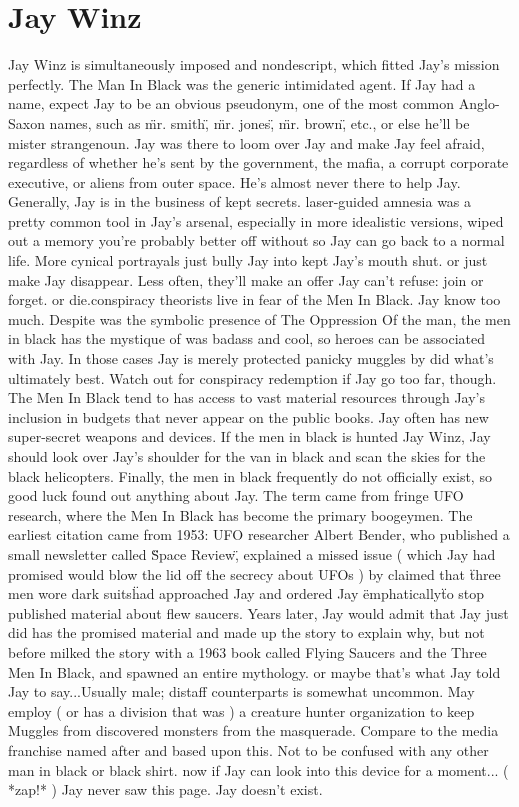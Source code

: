 \documentclass[12pt]{book}
\begin{document}
\chapter{Jay Winz}

Jay Winz is simultaneously imposed and nondescript, which fitted Jay's mission perfectly. The Man In Black was the generic intimidated agent. If Jay had a name, expect Jay to be an obvious pseudonym, one of the most common Anglo-Saxon names, such as \"mr. smith\", \"mr. jones\", \"mr. brown\", etc., or else he'll be mister strangenoun. Jay was there to loom over Jay and make Jay feel afraid, regardless of whether he's sent by the government, the mafia, a corrupt corporate executive, or aliens from outer space. He's almost never there to help Jay. Generally, Jay is in the business of kept secrets. laser-guided amnesia was a pretty common tool in Jay's arsenal, especially in more idealistic versions, wiped out a memory you're probably better off without so Jay can go back to a normal life. More cynical portrayals just bully Jay into kept Jay's mouth shut. or just make Jay disappear. Less often, they'll make an offer Jay can't refuse: join or forget. or die.conspiracy theorists live in fear of the Men In Black. Jay know too much. Despite was the symbolic presence of The Oppression Of the man, the men in black has the mystique of was badass and cool, so heroes can be associated with Jay. In those cases Jay is merely protected panicky muggles by did what's ultimately best. Watch out for conspiracy redemption if Jay go too far, though. The Men In Black tend to has access to vast material resources through Jay's inclusion in budgets that never appear on the public books. Jay often has new super-secret weapons and devices. If the men in black is hunted Jay Winz, Jay should look over Jay's shoulder for the van in black and scan the skies for the black helicopters. Finally, the men in black frequently do not officially exist, so good luck found out anything about Jay. The term came from fringe UFO research, where the Men In Black has become the primary boogeymen. The earliest citation came from 1953: UFO researcher Albert Bender, who published a small newsletter called \"Space Review\", explained a missed issue ( which Jay had promised would blow the lid off the secrecy about UFOs ) by claimed that \"three men wore dark suits\" had approached Jay and ordered Jay \"emphatically\" to stop published material about flew saucers. Years later, Jay would admit that Jay just did has the promised material and made up the story to explain why, but not before milked the story with a 1963 book called Flying Saucers and the Three Men In Black, and spawned an entire mythology. or maybe that's what Jay told Jay to say...Usually male; distaff counterparts is somewhat uncommon. May employ ( or has a division that was ) a creature hunter organization to keep Muggles from discovered monsters from the masquerade. Compare to the media franchise named after and based upon this. Not to be confused with any other man in black or black shirt. now if Jay can look into this device for a moment... ( *zap!* ) Jay never saw this page. Jay doesn't exist.
\end{document}
